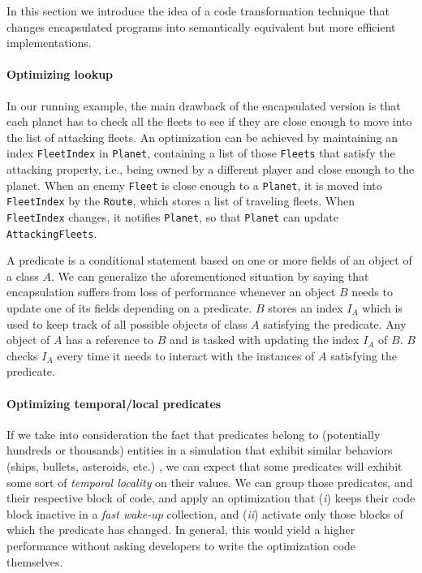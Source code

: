 In this section we introduce the idea of a code transformation technique that changes encapsulated programs into semantically equivalent but more efficient implementations.

\paragraph*{Optimizing lookup}

In our running example, the main drawback of the encapsulated version is that each planet has to check all the fleets to see if they are close enough to move into the list of attacking fleets. An optimization can be achieved by maintaining an index \texttt{FleetIndex} in \texttt{Planet}, containing a list of those \texttt{Fleets} that satisfy the attacking property, i.e., being owned by a different player and close enough to the planet. When an enemy \texttt{Fleet} is close enough to a \texttt{Planet}, it is moved into \texttt{FleetIndex} by the \texttt{Route}, which stores a list of traveling fleets. When \texttt{FleetIndex} changes, it notifies \texttt{Planet}, so that \texttt{Planet} can update \texttt{AttackingFleets}.

A predicate is a conditional statement based on one or more fields of an object of a class $A$. We can generalize the aforementioned situation by saying that encapsulation suffers from loss of performance whenever an object $B$ needs to update one of its fields depending on a predicate. $B$ stores an index $I_{A}$ which is used to keep track of all possible objects of class $A$ satisfying the predicate. Any object of $A$ has a reference to $B$ and is tasked with updating the index $I_{A}$ of $B$. $B$ checks $I_{A}$ every time it needs to interact with the instances of $A$ satisfying the predicate.

\paragraph*{Optimizing temporal/local predicates}

If we take into consideration the fact that predicates belong to (potentially hundreds or thousands) entities in a simulation that exhibit similar behaviors (ships, bullets, asteroids, etc.) \cite{ai_dithering}, we can expect that some predicates will exhibit some sort of \textit{temporal locality} on their values. We can group those predicates, and their respective block of code, and apply an optimization that (\textit{i}) keeps their code block inactive in a \textit{fast wake-up} collection, and (\textit{ii}) activate only those blocks of which the predicate has changed. In general, this would yield a higher performance without asking developers to write the optimization code themselves.


